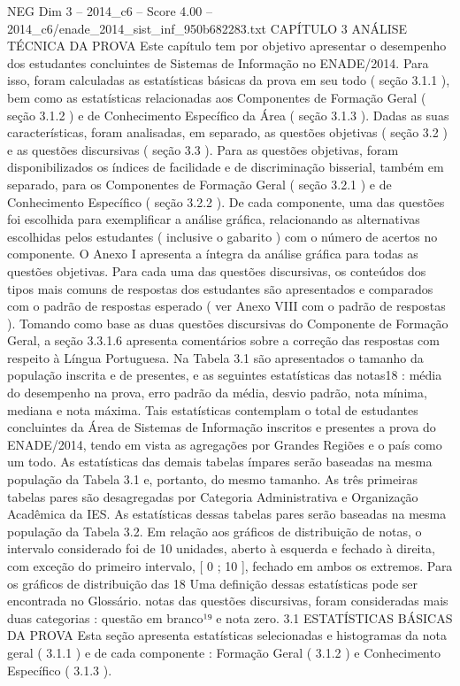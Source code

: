 \begin{textsample}{NEG Dim 3 – 2014\_c6 – Score 4.00 – 2014\_c6/enade\_2014\_sist\_inf\_950b682283.txt}  \label{ex:f3_neg_252}
CAPÍTULO 3 ANÁLISE TÉCNICA DA PROVA Este capítulo tem por objetivo apresentar o desempenho dos estudantes concluintes de Sistemas de Informação no ENADE/2014.
Para isso, foram calculadas as estatísticas básicas da prova em seu todo ( seção 3.1.1 ), bem como as estatísticas relacionadas aos Componentes de Formação Geral ( seção 3.1.2 ) e de Conhecimento Específico da Área ( seção 3.1.3 ).
Dadas as suas características, foram analisadas, em separado, as questões objetivas ( seção 3.2 ) e as questões discursivas ( seção 3.3 ).
Para as questões objetivas, foram disponibilizados os índices de facilidade e de discriminação bisserial, também em separado, para os Componentes de Formação Geral ( seção 3.2.1 ) e de Conhecimento Específico ( seção 3.2.2 ).
De cada componente, uma das questões foi escolhida para exemplificar a análise gráfica, relacionando as alternativas escolhidas pelos estudantes ( inclusive o gabarito ) com o número de acertos no componente.
O Anexo I apresenta a íntegra da análise gráfica para todas as questões objetivas.
Para cada uma das questões discursivas, os conteúdos dos tipos mais comuns de respostas dos estudantes são apresentados e comparados com o padrão de respostas esperado ( ver Anexo VIII com o padrão de respostas ).
Tomando como base as duas questões discursivas do Componente de Formação Geral, a seção 3.3.1.6 apresenta comentários sobre a correção das respostas com respeito à Língua Portuguesa.
Na Tabela 3.1 são apresentados o tamanho da população inscrita e de presentes, e as seguintes estatísticas das notas18 : média do desempenho na prova, erro padrão da média, desvio padrão, nota mínima, mediana e nota máxima.
Tais estatísticas contemplam o total de estudantes concluintes da Área de Sistemas de Informação inscritos e presentes a prova do ENADE/2014, tendo em vista as agregações por Grandes Regiões e o país como um todo.
As estatísticas das demais tabelas ímpares serão baseadas na mesma população da Tabela 3.1 e, portanto, do mesmo tamanho.
As três primeiras tabelas pares são desagregadas por Categoria Administrativa e Organização Acadêmica da IES.
As estatísticas dessas tabelas pares serão baseadas na mesma população da Tabela 3.2.
Em relação aos gráficos de distribuição de notas, o intervalo considerado foi de 10 unidades, aberto à esquerda e fechado à direita, com exceção do primeiro intervalo, [ 0 ; 10 ], fechado em ambos os extremos.
Para os gráficos de distribuição das 18 Uma definição dessas estatísticas pode ser encontrada no Glossário. notas das questões discursivas, foram consideradas mais duas categorias : questão em branco¹⁹ e nota zero. 3.1 ESTATÍSTICAS BÁSICAS DA PROVA Esta seção apresenta estatísticas selecionadas e histogramas da nota geral ( 3.1.1 ) e de cada componente : Formação Geral ( 3.1.2 ) e Conhecimento Específico ( 3.1.3 ).

\end{textsample}
